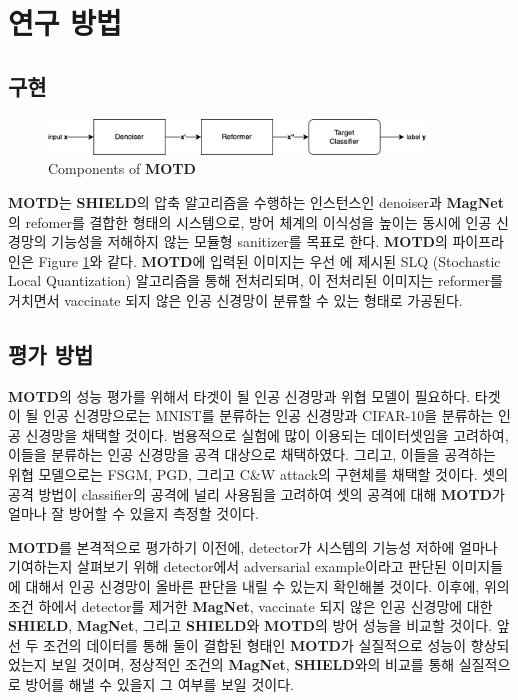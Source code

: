 \documentclass{article}
\begin{document}
\section{연구 방법}

\subsection{구현}

\begin{figure}[h]
    \centering
    \includegraphics[width=10cm]{images/motd-diagram.png}
    \caption{Components of \textbf{MOTD}}
    \label{fig:motd-diagram}
\end{figure}

\textbf{MOTD}는 \textbf{SHIELD}의 압축 알고리즘을 수행하는 인스턴스인 denoiser과 \textbf{MagNet}의 refomer를 결합한 형태의 시스템으로, 방어 체계의 이식성을 높이는 동시에 인공 신경망의 기능성을 저해하지 않는 모듈형 sanitizer를 목표로 한다. \textbf{MOTD}의 파이프라인은 Figure \ref{fig:motd-diagram}와 같다. \textbf{MOTD}에 입력된 이미지는 우선 \cite{das2018shield}에 제시된 SLQ (Stochastic Local Quantization) 알고리즘을 통해 전처리되며, 이 전처리된 이미지는 reformer를 거치면서 vaccinate 되지 않은 인공 신경망이 분류할 수 있는 형태로 가공된다.

\subsection{평가 방법}

\textbf{MOTD}의 성능 평가를 위해서 타겟이 될 인공 신경망과 위협 모델이 필요하다. 타겟이 될 인공 신경망으로는 MNIST를 분류하는 인공 신경망과 CIFAR-10을 분류하는 인공 신경망을 채택할 것이다. 범용적으로 실험에 많이 이용되는 데이터셋임을 고려하여, 이들을 분류하는 인공 신경망을 공격 대상으로 채택하였다. 그리고, 이들을 공격하는 위협 모델으로는 FSGM, PGD, 그리고 C\&W attack의 구현체를 채택할 것이다. 셋의 공격 방법이 classifier의 공격에 널리 사용됨을 고려하여 셋의 공격에 대해 \textbf{MOTD}가 얼마나 잘 방어할 수 있을지 측정할 것이다.

\textbf{MOTD}를 본격적으로 평가하기 이전에, detector가 시스템의 기능성 저하에 얼마나 기여하는지 살펴보기 위해 detector에서 adversarial example이라고 판단된 이미지들에 대해서 인공 신경망이 올바른 판단을 내릴 수 있는지 확인해볼 것이다. 이후에, 위의 조건 하에서 detector를 제거한 \textbf{MagNet}, vaccinate 되지 않은 인공 신경망에 대한 \textbf{SHIELD}, \textbf{MagNet}, 그리고 \textbf{SHIELD}와 \textbf{MOTD}의 방어 성능을 비교할 것이다. 앞선 두 조건의 데이터를 통해 둘이 결합된 형태인 \textbf{MOTD}가 실질적으로 성능이 향상되었는지 보일 것이며, 정상적인 조건의 \textbf{MagNet}, \textbf{SHIELD}와의 비교를 통해 실질적으로 방어를 해낼 수 있을지 그 여부를 보일 것이다.  
\end{document}
